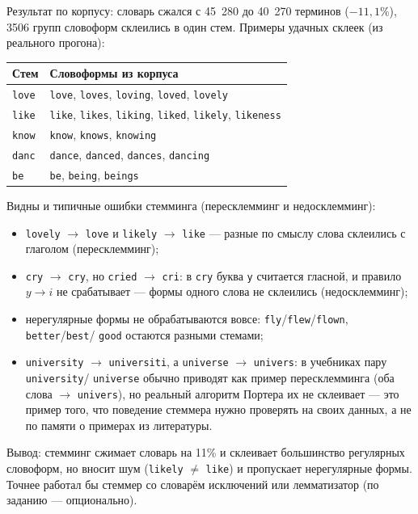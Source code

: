 Результат по корпусу: словарь сжался с 45~280 до 40~270 терминов
($-11{,}1\%$), 3506 групп словоформ склеились в один стем. Примеры удачных
склеек (из реального прогона):

\begin{tabular}{|l|l|}
\hline
Стем & Словоформы из корпуса \\ \hline
\texttt{love} & \texttt{love}, \texttt{loves}, \texttt{loving},
\texttt{loved}, \texttt{lovely} \\ \hline
\texttt{like} & \texttt{like}, \texttt{likes}, \texttt{liking},
\texttt{liked}, \texttt{likely}, \texttt{likeness} \\ \hline
\texttt{know} & \texttt{know}, \texttt{knows}, \texttt{knowing} \\ \hline
\texttt{danc} & \texttt{dance}, \texttt{danced}, \texttt{dances},
\texttt{dancing} \\ \hline
\texttt{be} & \texttt{be}, \texttt{being}, \texttt{beings} \\ \hline
\end{tabular}

Видны и типичные ошибки стемминга (пересклемминг и недосклемминг):

\begin{itemize}
    \item \texttt{lovely} $\to$ \texttt{love} и \texttt{likely} $\to$
    \texttt{like} --- разные по смыслу слова склеились с глаголом
    (пересклемминг);
    \item \texttt{cry} $\to$ \texttt{cry}, но \texttt{cried} $\to$
    \texttt{cri}: в \texttt{cry} буква \texttt{y} считается гласной, и правило
    $y \to i$ не срабатывает --- формы одного слова не склеились
    (недосклемминг);
    \item нерегулярные формы не обрабатываются вовсе:
    \texttt{fly}/\texttt{flew}/\texttt{flown}, \texttt{better}/\texttt{best}/
    \texttt{good} остаются разными стемами;
    \item \texttt{university} $\to$ \texttt{universiti}, а \texttt{universe}
    $\to$ \texttt{univers}: в учебниках пару \texttt{university}/
    \texttt{universe} обычно приводят как пример пересклемминга (оба слова
    $\to$ \texttt{univers}), но реальный алгоритм Портера их не склеивает ---
    это пример того, что поведение стеммера нужно проверять на своих данных,
    а не по памяти о примерах из литературы.
\end{itemize}

Вывод: стемминг сжимает словарь на 11\% и склеивает большинство регулярных
словоформ, но вносит шум (\texttt{likely} $\ne$ \texttt{like}) и пропускает
нерегулярные формы. Точнее работал бы стеммер со словарём исключений или
лемматизатор (по заданию --- опционально).

